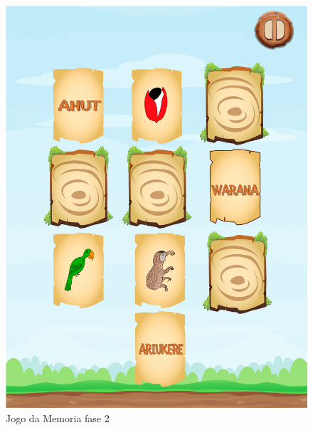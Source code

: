 \documentclass[12pt]{article}
\begin{document}
\begin{figure}[!htb]
			\includegraphics[width=\linewidth]{img/memoryGame.png}
			\caption{Jogo da Memoria fase 2}\label{fig:exampleFig7}
			\endminipage\hspace{0.4cm}%

\end{figure}
\end{document}
